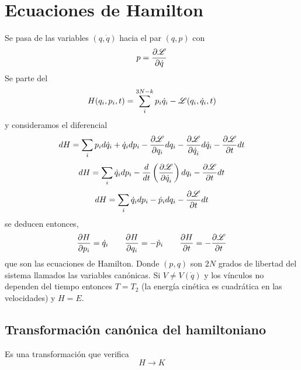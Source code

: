 \documentclass[10pt,oneside]{CBFT_book}
\begin{document}
\chapter{Ecuaciones de Hamilton}

Se pasa de las variables $(q, \dot{q})$ hacia el par $(q,p)$ con 
\[
	p = \dpar{\Lag}{\dot{q}}
\]
Se parte del 
\[
	H(q_i, p_i, t) = \sum_{i}^{3N-k} p_i \dot{q}_i - \Lag(q_i, \dot{q}_i, t)
\]
y consideramos el diferencial
\[
	dH = \sum_i p_i d\dot{q}_i + \dot{q}_i dp_i - \dpar{\Lag}{q_i} dq_i - \dpar{\Lag}{\dot{q}_i}d\dot{q}_i - \dpar{\Lag}{t}dt
\]
\[
	dH = \sum_i \dot{q}_i dp_i - \frac{d}{dt}\left( \dpar{\Lag}{\dot{q}_i} \right) dq_i - \dpar{\Lag}{t}dt
\]
\[
	dH = \sum_i \dot{q}_i dp_i - \dot{p}_i dq_i - \dpar{\Lag}{t}dt
\]
se deducen entonces,
\[
	\dpar{H}{p_i} = \dot{q}_i \qquad \dpar{H}{q_i} = -\dot{p}_i \qquad \dpar{H}{t} = -\dpar{\Lag}{t}
\]
que son las ecuaciones de Hamilton. Donde $(p,q)$ son $2N$ grados de libertad del sistema llamados las variables canónicas.
Si $V\neq V(\dot{q})$ y los vínculos no dependen del tiempo entonces $T=T_2$ (la energía cinética es cuadrática en las 
velocidades) y $H=E$.

\section{Transformación canónica del hamiltoniano}

Es una transformación que verifica
\[
	H \longrightarrow K
\]


\end{document}
